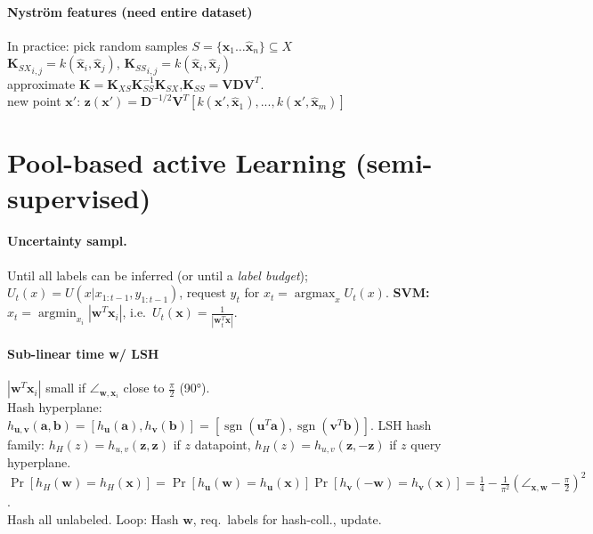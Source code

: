 \documentclass[11pt]{scrartcl}
\DeclareMathOperator{\sign}{sgn}
\DeclareMathOperator{\argmin}{argmin}
\DeclareMathOperator{\argmax}{argmax}
\begin{document}
\begin{multicols}{3}
\paragraph{Nyström features (need entire dataset)}
In practice: pick random samples $S = \{\hat{\bm x}_1 \dots \hat{\bm x}_n\} \subseteq X$ \\
${\bm K_{SX}}_{i,j} = k(\hat{\bm x}_i, \hat{\bm x}_j)$, ${\bm K_{SS}}_{i,j} = k(\hat{\bm x}_i, \hat{\bm x}_j)$\\
approximate $\bm K = \bm K_{XS}\bm K_{SS}^{-1}\bm K_{SX}$,$\bm K_{SS}=\bm V \bm D \bm V^T$.\\
new point $\bm x'$: $\bm z(\bm x') = \bm D^{-1/2} \bm V^T [k(\bm x', \hat{\bm x}_1),...,k(\bm x', \hat{\bm x}_m)]$


\section{Pool-based active Learning (semi-supervised)}

\paragraph{Uncertainty sampl.}
Until all labels can be inferred (or until a \emph{label budget});
$U_t(x) = U(x | x_{1:t-1}, y_{1:t-1})$, request $y_t$ for $x_t = \argmax_x U_t(x)$.
\textbf{SVM:} $x_t = \argmin_{x_i}|\bm w^T\bm x_i|$, i.e.\ $U_t(\bm x) = \frac{1}{|\bm w_t^T \bm x|}$.

\paragraph{Sub-linear time w/ LSH}
$|\bm w^T\bm x_i|$ small if $\angle_{\bm w,\bm x_i}$ close to $\frac{\pi}{2}$ (90°).\\
Hash hyperplane:
$h_{\bm u,\bm v}(\bm a,\bm b) = [h_{\bm u}(\bm a), h_{\bm v}(\bm b)] = [\sign(\bm u^T\bm a),\sign(\bm v^T\bm b)]$.
LSH hash family: $h_H(z) = h_{u,v}(\bm z,\bm z)$ if $z$ datapoint, $h_H(z) = h_{u,v}(\bm z,-\bm z)$ if $z$ query hyperplane.
$\Pr[h_H(\bm w) = h_H(\bm x)] = \Pr[h_{\bm u}(\bm w) = h_{\bm u}(\bm x)]\Pr[h_{\bm v}(-\bm w) = h_{\bm v}(\bm x)] = \frac{1}{4} - \frac{1}{\pi^2}(\angle_{\bm x,\bm w} - \frac{\pi}{2})^2$.\\
Hash all unlabeled. Loop: Hash $\bm w$, req.\ labels for hash-coll., update.


\end{multicols}
\end{document}
